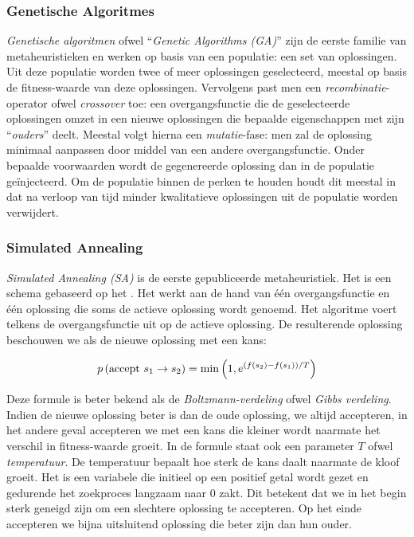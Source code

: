 \subsubsection{Genetische Algoritmes}

\emph{Genetische algoritmen} ofwel ``\emph{Genetic Algorithms (GA)}'' zijn de eerste familie van metaheuristieken en werken op basis van een populatie: een set van oplossingen. Uit deze populatie worden twee of meer oplossingen geselecteerd, meestal op basis de fitness-waarde van deze oplossingen. Vervolgens past men een \emph{recombinatie}-operator ofwel \emph{crossover} toe: een overgangsfunctie die de geselecteerde oplossingen omzet in een nieuwe oplossingen die bepaalde eigenschappen met zijn ``\emph{ouders}'' deelt. Meestal volgt hierna een \emph{mutatie}-fase: men zal de oplossing minimaal aanpassen door middel van een andere overgangsfunctie. Onder bepaalde voorwaarden wordt de gegenereerde oplossing dan in de populatie ge\"injecteerd. Om de populatie binnen de perken te houden houdt dit meestal in dat na verloop van tijd minder kwalitatieve oplossingen uit de populatie worden verwijdert.\cite{holland1992adaption-in-nat,goldberg89,melanie_mitchell_book}

\subsubsection{Simulated Annealing}

\emph{Simulated Annealing (SA)} is de eerste gepubliceerde metaheuristiek. Het is een schema gebaseerd op het \cite{Metropolis1953}. Het werkt aan de hand van \'e\'en overgangsfunctie en \'e\'en oplossing die soms de actieve oplossing wordt genoemd. Het algoritme voert telkens de overgangsfunctie uit op de actieve oplossing. De resulterende oplossing beschouwen we als de nieuwe oplossing met een kans:

\begin{equation}
p\left(\mbox{accept $s_1\rightarrow s_2$}\right)=\min\left(1,e^{\left(f\left(s_2\right)-f\left(s_1\right)\right)/T}\right)
\end{equation}

Deze formule is beter bekend als de \emph{Boltzmann-verdeling} ofwel \emph{Gibbs verdeling}\cite{}. Indien de nieuwe oplossing beter is dan de oude oplossing, we altijd accepteren, in het andere geval accepteren we met een kans die kleiner wordt naarmate het verschil in fitness-waarde groeit. In de formule staat ook een parameter $T$ ofwel \emph{temperatuur}. De temperatuur bepaalt hoe sterk de kans daalt naarmate de kloof groeit. Het is een variabele die initieel op een positief getal wordt gezet en gedurende het zoekproces langzaam naar $0$ zakt. Dit betekent dat we in het begin sterk geneigd zijn om een slechtere oplossing te accepteren. Op het einde accepteren we bijna uitsluitend oplossing die beter zijn dan hun ouder.\cite{citeulike:1612433,Cerny1985Thermodynamical}

